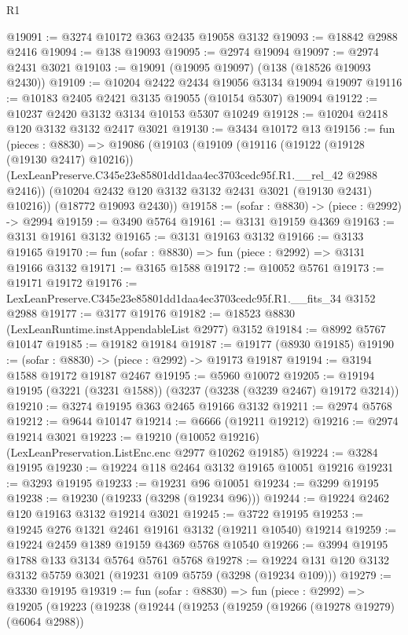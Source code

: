 \begin{lexlean}{R1}
\begin{coremodule}
@19091 := @3274 @10172 @363 @2435 @19058 @3132
@19093 := @18842 @2988 @2416
@19094 := @138 @19093
@19095 := @2974 @19094
@19097 := @2974 @2431 @3021
@19103 := @19091 (@19095 @19097) (@138 (@18526 @19093 @2430))
@19109 := @10204 @2422 @2434 @19056 @3134 @19094 @19097
@19116 := @10183 @2405 @2421 @3135 @19055 (@10154 @5307) @19094
@19122 := @10237 @2420 @3132 @3134 @10153 @5307 @10249
@19128 := @10204 @2418 @120 @3132 @3132 @2417 @3021
@19130 := @3434 @10172 @13
@19156 := fun (pieces : @8830) =>
  @19086
    (@19103
      (@19109
        (@19116
          (@19122 (@19128 (@19130 @2417) @10216))
          (LexLeanPreserve.C345e23e85801dd1daa4ec3703cedc95f.R1.__rel_42 @2988 @2416))
        (@10204 @2432 @120 @3132 @3132 @2431 @3021 (@19130 @2431) @10216))
      (@18772 @19093 @2430))
@19158 := (sofar : @8830) -> (piece : @2992) -> @2994
@19159 := @3490 @5764
@19161 := @3131 @19159 @4369
@19163 := @3131 @19161 @3132
@19165 := @3131 @19163 @3132
@19166 := @3133 @19165
@19170 := fun (sofar : @8830) => fun (piece : @2992) => @3131 @19166 @3132
@19171 := @3165 @1588
@19172 := @10052 @5761
@19173 := @19171 @19172
@19176 := LexLeanPreserve.C345e23e85801dd1daa4ec3703cedc95f.R1.__fits_34 @3152 @2988
@19177 := @3177 @19176
@19182 := @18523 @8830 (LexLeanRuntime.instAppendableList @2977) @3152
@19184 := @8992 @5767 @10147
@19185 := @19182 @19184
@19187 := @19177 (@8930 @19185)
@19190 := (sofar : @8830) -> (piece : @2992) -> @19173 @19187
@19194 := @3194 @1588 @19172 @19187 @2467
@19195 := @5960 @10072
@19205 := @19194 @19195 (@3221 (@3231 @1588)) (@3237 (@3238 (@3239 @2467) @19172 @3214))
@19210 := @3274 @19195 @363 @2465 @19166 @3132
@19211 := @2974 @5768
@19212 := @9644 @10147
@19214 := @6666 (@19211 @19212)
@19216 := @2974 @19214 @3021
@19223 := @19210 (@10052 @19216) (LexLeanPreservation.ListEnc.enc @2977 @10262 @19185)
@19224 := @3284 @19195
@19230 := @19224 @118 @2464 @3132 @19165 @10051 @19216
@19231 := @3293 @19195
@19233 := @19231 @96 @10051
@19234 := @3299 @19195
@19238 := @19230 (@19233 (@3298 (@19234 @96)))
@19244 := @19224 @2462 @120 @19163 @3132 @19214 @3021
@19245 := @3722 @19195
@19253 := @19245 @276 @1321 @2461 @19161 @3132 (@19211 @10540) @19214
@19259 := @19224 @2459 @1389 @19159 @4369 @5768 @10540
@19266 := @3994 @19195 @1788 @133 @3134 @5764 @5761 @5768
@19278 := @19224 @131 @120 @3132 @3132 @5759 @3021 (@19231 @109 @5759 (@3298 (@19234 @109)))
@19279 := @3330 @19195
@19319 := fun (sofar : @8830) =>
  fun (piece : @2992) =>
  @19205
    (@19223
      (@19238
        (@19244
          (@19253
            (@19259
              (@19266 (@19278 @19279) (@6064 @2988))

\end{coremodule}
\end{lexlean}
